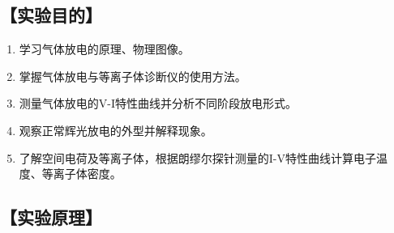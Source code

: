 \documentclass[12pt,a4paper,UTF8]{ctexart}
\begin{document}
\begin{abstract}
	Gas discharge, as a fundamental phenomenon in modern physics and plasma physics, finds wide applications in vacuum electronics, materials science, aerospace technology, and other fields.\cite{hiden2003probe}
	In this experiment, the gas discharge phenomena within a discharge tube were observed, and the V-I characteristic curve of the discharge tube was measured and analyzed, providing a deeper understanding of the essential differences between gas and metal conduction.\cite{smartprobe2002manual}
	Furthermore, Langmuir probe diagnostics were performed in the positive column region of the glow discharge to measure the I-V characteristic curve, from which the plasma space potential, electron temperature, and plasma density were calculated.\cite{plasmart2004probe}
	Through experimental operations and data analysis, the physical characteristics and formation mechanisms of different regions in normal glow discharge were mastered, enhancing the understanding of the gas discharge process and fundamental plasma properties, and laying a solid experimental foundation for future research and applications in plasma-related technologies.
	
	\noindent \textbf{Keywords: gas discharge~~ glow discharge~~ V-I characteristic curve~~ Langmuir probe~~ plasma diagnosis}
\end{abstract}


\subsection*{【实验目的】}

\begin{enumerate}[(1)]
	\item 学习气体放电的原理、物理图像。
	\item 掌握气体放电与等离子体诊断仪的使用方法。
	\item 测量气体放电的V-I特性曲线并分析不同阶段放电形式。
	\item 观察正常辉光放电的外型并解释现象。
	\item 了解空间电荷及等离子体，根据朗缪尔探针测量的I-V特性曲线计算电子温度、等离子体密度。
\end{enumerate}

\subsection*{【实验原理】}
\end{document}
